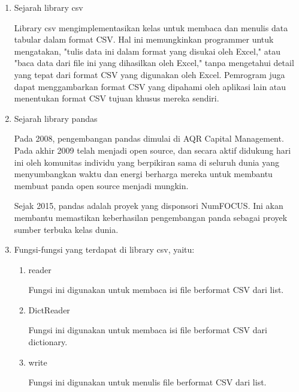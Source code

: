 \begin{enumerate}
	\item Sejarah library csv
	
	Library csv mengimplementasikan kelas untuk membaca dan menulis data tabular dalam format CSV. Hal ini memungkinkan programmer untuk mengatakan, "tulis data ini dalam format yang disukai oleh Excel," atau "baca data dari file ini yang dihasilkan oleh Excel," tanpa mengetahui detail yang tepat dari format CSV yang digunakan oleh Excel. Pemrogram juga dapat menggambarkan format CSV yang dipahami oleh aplikasi lain atau menentukan format CSV tujuan khusus mereka sendiri.
	
	\item Sejarah library pandas
	
	Pada 2008, pengembangan pandas dimulai di AQR Capital Management. Pada akhir 2009 telah menjadi open source, dan secara aktif didukung hari ini oleh komunitas individu yang berpikiran sama di seluruh dunia yang menyumbangkan waktu dan energi berharga mereka untuk membantu membuat panda open source menjadi mungkin.
	
	Sejak 2015, pandas adalah proyek yang disponsori NumFOCUS. Ini akan membantu memastikan keberhasilan pengembangan panda sebagai proyek sumber terbuka kelas dunia.
	
	\item Fungsi-fungsi yang terdapat di library csv, yaitu:
	\begin{enumerate}
		\item reader
		
		Fungsi ini digunakan untuk membaca isi file berformat CSV dari list.
		
		
		
		\item DictReader
		
		Fungsi ini digunakan untuk membaca isi file berformat CSV dari dictionary.
		
		
		
		\item write
		
		Fungsi ini digunakan untuk menulis file berformat CSV dari list.
		
		
		

\end{enumerate}
\end{enumerate}
